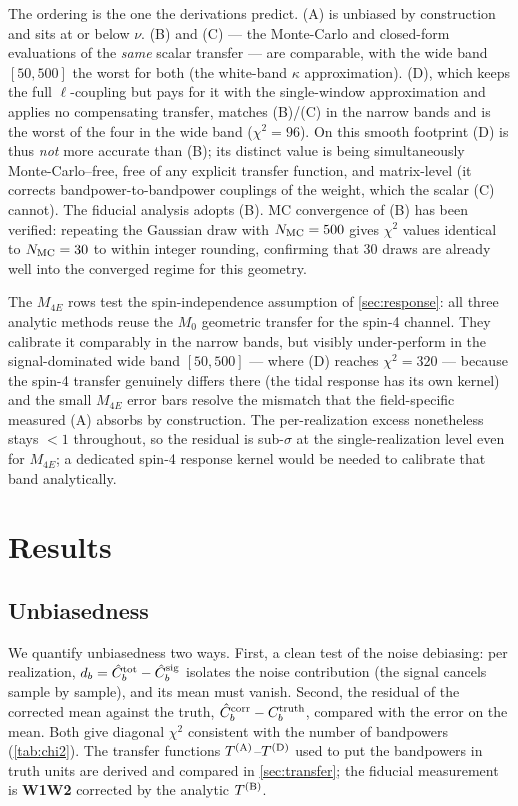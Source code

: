 \documentclass[11pt]{article}
\begin{document}
The ordering is the one the derivations predict. (A) is unbiased by construction
and sits at or below $\nu$. (B) and (C) --- the Monte-Carlo and closed-form
evaluations of the \emph{same} scalar transfer --- are comparable, with the wide
band $[50,500]$ the worst for both (the white-band $\kappa$ approximation). (D),
which keeps the full $\ell$-coupling but pays for it with the single-window
approximation and applies no compensating transfer, matches (B)/(C) in the narrow
bands and is the worst of the four in the wide band ($\chi^2=96$). On this
smooth footprint (D) is thus \emph{not} more accurate than (B); its distinct
value is being simultaneously Monte-Carlo--free, free of any explicit transfer
function, and matrix-level (it corrects bandpower-to-bandpower couplings of the
weight, which the scalar (C) cannot). The fiducial analysis adopts (B).
MC convergence of (B) has been verified: repeating the Gaussian draw with
$N_{\rm MC}=500$ gives $\chi^2$ values identical to $N_{\rm MC}=30$ to within
integer rounding, confirming that 30 draws are already well into the converged
regime for this geometry.

The $M_{4E}$ rows test the spin-independence assumption of \cref{sec:response}:
all three analytic methods reuse the $M_0$ geometric transfer for the spin-4
channel. They calibrate it comparably in the narrow bands, but visibly
under-perform in the signal-dominated wide band $[50,500]$ --- where (D) reaches
$\chi^2=320$ --- because the spin-4 transfer genuinely differs there (the tidal
response has its own kernel) and the small $M_{4E}$ error bars resolve the
mismatch that the field-specific measured (A) absorbs by construction. The
per-realization excess nonetheless stays $<1$ throughout, so the residual is
sub-$\sigma$ at the single-realization level even for $M_{4E}$; a dedicated
spin-4 response kernel would be needed to calibrate that band analytically.

\section{Results}

\subsection{Unbiasedness}\label{sec:unbias}

We quantify unbiasedness two ways. First, a clean test of the noise debiasing:
per realization, $d_b=\hat C^{\rm tot}_b-\hat C^{\rm sig}_b$ isolates the noise
contribution (the signal cancels sample by sample), and its mean must vanish.
Second, the residual of the corrected mean against the truth,
$\hat C^{\rm corr}_b-C^{\rm truth}_b$, compared with the error on the mean.
Both give diagonal $\chi^2$ consistent with the number of bandpowers
(\cref{tab:chi2}). The transfer functions $T^{\rm (A)}$--$T^{\rm (D)}$ used to put
the bandpowers in truth units are derived and compared in \cref{sec:transfer};
the fiducial measurement is \textbf{W1W2} corrected by the analytic $T^{\rm (B)}$.
\end{document}
